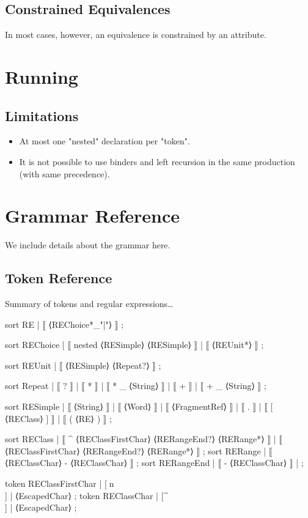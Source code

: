 \documentclass[11pt]{article} %
\begin{document}
\subsection{Constrained Equivalences}

In most cases, however, an equivalence is constrained by an attribute. \TBD


\section{Running \HAX}
\label{sec:run}

\subsection{Limitations}
\begin{itemize}

\item At most one "nested" declaration per "token".

\item It is not possible to use binders and left recursion in the same production (with same
  precedence).

\end{itemize}


\small
\appendix

\section{Grammar Reference}
\label{app:grammar}

We include details about the grammar here.

\subsection{Token Reference}
\label{app:token-reference}

Summary of tokens and regular expressions…\TBD

\begin{code}
sort RE | ⟦ ⟨REChoice*_"|"⟩ ⟧ ;

sort REChoice
| ⟦ nested ⟨RESimple⟩ ⟨RESimple⟩ ⟧
| ⟦ ⟨REUnit*⟩ ⟧
;

sort REUnit | ⟦ ⟨RESimple⟩ ⟨Repeat?⟩ ⟧ ;

sort Repeat | ⟦ ? ⟧
            | ⟦ * ⟧
            | ⟦ * _ ⟨String⟩ ⟧
            | ⟦ + ⟧
            | ⟦ + _ ⟨String⟩ ⟧
            ;

sort RESimple
| ⟦ ⟨String⟩ ⟧
| ⟦ ⟨Word⟩ ⟧
| ⟦ ⟨FragmentRef⟩ ⟧
| ⟦ . ⟧
| ⟦ [ ⟨REClass⟩ ] ⟧
| ⟦ ( ⟨RE⟩ ) ⟧
;

sort REClass
| ⟦ ^ ⟨REClassFirstChar⟩ ⟨RERangeEnd?⟩ ⟨RERange*⟩ ⟧
| ⟦ ⟨REClassFirstChar⟩ ⟨RERangeEnd?⟩ ⟨RERange*⟩ ⟧
;
sort RERange | ⟦ ⟨REClassChar⟩ - ⟨REClassChar⟩ ⟧ ;
sort RERangeEnd | ⟦ - ⟨REClassChar⟩ ⟧ | ;

token REClassFirstChar | [^^\n\\] | ⟨EscapedChar⟩ ;
token REClassChar | [^\]\n\\] | ⟨EscapedChar⟩ ;
\end{code}
\end{document}
